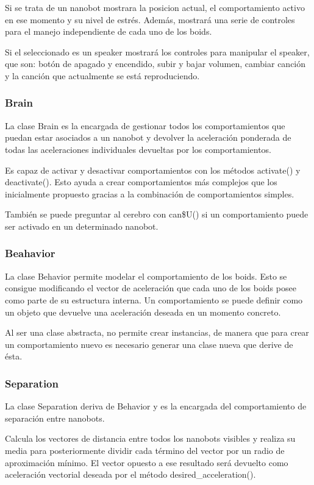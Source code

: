 Si se trata de un nanobot mostrara la posicion actual, el comportamiento activo en ese momento y su nivel de estrés. Además, mostrará una serie de controles para el manejo independiente de cada uno de los boids.

Si el seleccionado es un speaker mostrará los controles para manipular el speaker, que son: botón de apagado y encendido, subir y bajar volumen, cambiar canción y la canción que actualmente se está reproduciendo.  

\subsubsection{Brain}
\label{sec:brain}
La clase Brain es la encargada de gestionar todos los comportamientos que puedan estar asociados a un nanobot y devolver la aceleración ponderada de todas las aceleraciones individuales devueltas por los comportamientos.

Es capaz de activar y desactivar comportamientos con los métodos activate() y deactivate(). Esto ayuda a crear comportamientos más complejos que los inicialmente propuesto gracias a la combinación de comportamientos simples.

También se puede preguntar al cerebro con can\$U() si un comportamiento puede ser activado en un determinado nanobot.

\subsubsection{Beahavior}
\label{sec:beahavior}
La clase Behavior permite modelar el comportamiento de los boids. Esto se consigue modificando el vector de aceleración que cada uno de los boids posee como parte de su estructura interna. Un comportamiento se puede definir como un objeto que devuelve una aceleración deseada en un momento concreto.

Al ser una clase abstracta, no permite crear instancias, de manera que para crear un comportamiento nuevo es necesario generar una clase nueva que derive de ésta.

\subsubsection{Separation}
\label{sec:separation}
La clase Separation deriva de Behavior y es la encargada del comportamiento de separación entre nanobots.

Calcula  los vectores de distancia entre todos los nanobots visibles y realiza su media para posteriormente dividir cada término del vector por un radio de aproximación mínimo. El vector opuesto a ese resultado será devuelto como aceleración vectorial deseada por el método desired\_acceleration().

